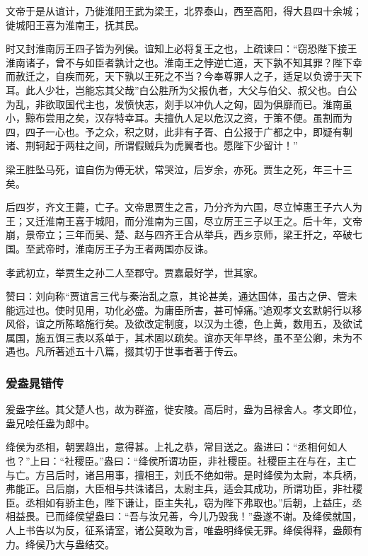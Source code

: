 \documentclass[]{article}
\begin{document}
文帝于是从谊计，乃徙淮阳王武为梁王，北界泰山，西至高阳，得大县四十余城；徙城阳王喜为淮南王，抚其民。

时又封淮南厉王四子皆为列侯。谊知上必将复王之也，上疏谏曰：``窃恐陛下接王淮南诸子，曾不与如臣者孰计之也。淮南王之悖逆亡道，天下孰不知其罪？陛下幸而赦迁之，自疾而死，天下孰以王死之不当？今奉尊罪人之子，适足以负谤于天下耳。此人少壮，岂能忘其父哉''白公胜所为父报仇者，大父与伯父、叔父也。白公为乱，非欲取国代主也，发愤快志，剡手以冲仇人之匈，固为俱靡而已。淮南虽小，黥布尝用之矣，汉存特幸耳。夫擅仇人足以危汉之资，于策不便。虽割而为四，四子一心也。予之众，积之财，此非有子胥、白公报于广都之中，即疑有剸诸、荆轲起于两柱之间，所谓假贼兵为虎翼者也。愿陛下少留计！''

梁王胜坠马死，谊自伤为傅无状，常哭泣，后岁余，亦死。贾生之死，年三十三矣。

后四岁，齐文王薨，亡子。文帝思贾生之言，乃分齐为六国，尽立悼惠王子六人为王；又迁淮南王喜于城阳，而分淮南为三国，尽立厉王三子以王之。后十年，文帝崩，景帝立；三年而吴、楚、赵与四齐王合从举兵，西乡京师，梁王扞之，卒破七国。至武帝时，淮南厉王子为王者两国亦反诛。

孝武初立，举贾生之孙二人至郡守。贾嘉最好学，世其家。

赞曰：刘向称``贾谊言三代与秦治乱之意，其论甚美，通达国体，虽古之伊、管未能远过也。使时见用，功化必盛。为庸臣所害，甚可悼痛。''追观孝文玄默躬行以移风俗，谊之所陈略施行矣。及欲改定制度，以汉为土德，色上黄，数用五，及欲试属国，施五饵三表以系单于，其术固以疏矣。谊亦天年早终，虽不至公卿，未为不遇也。凡所著述五十八篇，掇其切于世事者著于传云。

\hypertarget{header-n4142}{%
\subsubsection{爰盎晁错传}\label{header-n4142}}

爰盎字丝。其父楚人也，故为群盗，徙安陵。高后时，盎为吕禄舍人。孝文即位，盎兄哙任盎为郎中。

绛侯为丞相，朝罢趋出，意得甚。上礼之恭，常目送之。盎进曰：``丞相何如人也？''上曰：``社稷臣。''盎曰：``绛侯所谓功臣，非社稷臣。社稷臣主在与在，主亡与亡。方吕后时，诸吕用事，擅相王，刘氏不绝如带。是时绛侯为太尉，本兵柄，弗能正。吕后崩，大臣相与共诛诸吕，太尉主兵，适会其成功，所谓功臣，非社稷臣。丞相如有骄主色，陛下谦让，臣主失礼，窃为陛下弗取也。''后朝，上益庄，丞相益畏。已而绛侯望盎曰：``吾与汝兄善，今儿乃毁我！''盎遂不谢。及绛侯就国，人上书告以为反，征系请室，诸公莫敢为言，唯盎明绛侯无罪。绛侯得释，盎颇有力。绛侯乃大与盎结交。
\end{document}
